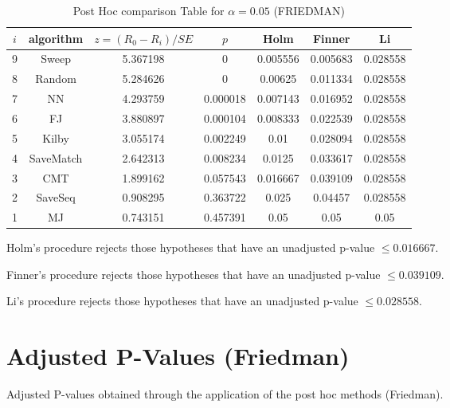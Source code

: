 \documentclass[a4paper,10pt]{article}
\begin{document}
\begin{landscape}
\begin{table}[!htp]
\centering\footnotesize
\begin{tabular}{ccccccc}
$i$&algorithm&$z=(R_0 - R_i)/SE$&$p$&Holm &Finner&Li\\
\hline9&Sweep&5.367198&0&0.005556&0.005683&0.028558\\8&Random&5.284626&0&0.00625&0.011334&0.028558\\7&NN&4.293759&0.000018&0.007143&0.016952&0.028558\\6&FJ&3.880897&0.000104&0.008333&0.022539&0.028558\\5&Kilby&3.055174&0.002249&0.01&0.028094&0.028558\\4&SaveMatch&2.642313&0.008234&0.0125&0.033617&0.028558\\3&CMT&1.899162&0.057543&0.016667&0.039109&0.028558\\2&SaveSeq&0.908295&0.363722&0.025&0.04457&0.028558\\1&MJ&0.743151&0.457391&0.05&0.05&0.05\\\hline
\end{tabular}
\caption{Post Hoc comparison Table for $\alpha=0.05$ (FRIEDMAN)}
\end{table}Holm's procedure rejects those hypotheses that have an unadjusted p-value $\le0.016667$.

Finner's procedure rejects those hypotheses that have an unadjusted p-value $\le0.039109$.

Li's procedure rejects those hypotheses that have an unadjusted p-value $\le0.028558$.


\newpage

\section{Adjusted P-Values (Friedman)}


Adjusted P-values obtained through the application of the post hoc methods (Friedman).


\end{landscape}
\end{document}
